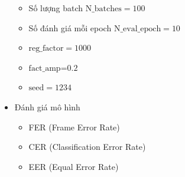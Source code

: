 \documentclass{article}
\begin{document}
\begin{itemize}
\begin{itemize}
			\item Số lượng batch $\text{N\_batches}=100$
			\item Số đánh giá mỗi epoch $\text{N\_eval\_epoch}=10$
			\item $\text{reg\_factor}=1000$
			\item $\text{fact\_amp=0.2}$
			\item $\text{seed}=1234$
		\end{itemize}
		\item Đánh giá mô hình
		\begin{itemize}
			\item FER (Frame Error Rate)
			\item CER (Classification Error Rate)
			\item EER (Equal Error Rate)
		\end{itemize}
	\end{itemize}
\end{document}
